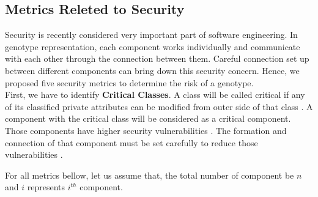 \documentclass[letterpaper, 10 pt, conference]{ieeeconf}  %
\begin{document}
\subsection{Metrics Releted to Security}
Security is recently considered very important part of  software engineering. In genotype representation, each component works individually and  communicate with each other through the connection between them. 
Careful connection set up between different components can bring down this security concern. Hence, we proposed five security metrics to determine the risk of a genotype. \\ 
First, we have to identify \textbf{Critical Classes}. A class will be called critical if any of its classified private attributes can be modified from outer side of that class \cite{alshammari2010security}. A component with the critical class will be considered as a critical component. Those components have higher security  vulnerabilities . The formation and connection of that component must be set carefully to reduce those  vulnerabilities .

For all metrics bellow, let us assume that, the total number of component be $n$ and $i$ represents $i^{th}$ component.
\end{document}
